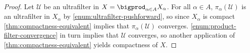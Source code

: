 \documentclass[article, a4paper, 11pt, oneside]{memoir}
\numberwithin{equation}{chapter}
\newcommand{\calU}{\mathcal{U}}
\theoremstyle{nonumberplain}
\begin{document}
\begin{proof}
    Let $\calU$ be an ultrafilter in $X = \bigprod_{\alpha \in A} X_\alpha$. For all $\alpha \in A$, $\pi_\alpha(\calU)$ is an ultrafilter in $X_\alpha$ by \cref{enum:ultrafilter-pushforward}, so since $X_\alpha$ is compact \cref{thm:compactness-equivalent} implies that $\pi_\alpha(\calU)$ converges. \cref{enum:product-filter-convergence} in turn implies that $\calU$ converges, so another application of \cref{thm:compactness-equivalent} yields compactness of $X$.
\end{proof}


\nocite{*}

\printbibliography
\end{document}
